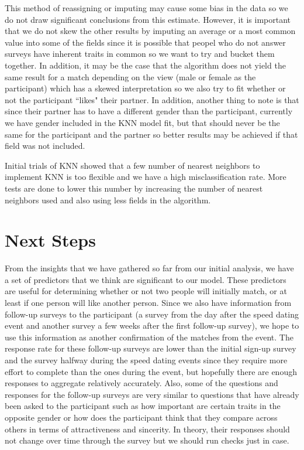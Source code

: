 \documentclass{article}
\begin{document}
This method of reassigning or imputing may cause some bias in the data so we do not draw significant conclusions from this estimate.  However, it is important that we do not skew the other results by imputing an average or a most common value into some of the fields since it is possible that peopel who do not answer surveys have inherent traits in common so we want to try and bucket them together.  In addition, it may be the case that the algorithm does not yield the same result for a match depending on the view (male or female as the participant) which has a skewed interpretation so we also try to fit whether or not the participant ``likes" their partner.  In addition, another thing to note is that since their partner has to have a different gender than the participant, currently we have gender included in the KNN model fit, but that should never be the same for the participant and the partner so better results may be achieved if that field was not included.

Initial trials of KNN showed that a few number of nearest neighbors to implement KNN is too flexible and we have a high misclassification rate.  More tests are done to lower this number by increasing the number of nearest neighbors used and also using less fields in the algorithm.
 

\section{Next Steps}
From the insights that we have gathered so far from our initial analysis, we have a set of predictors that we think are significant to our model.  These predictors are useful for determining whether or not two people will initially match, or at least if one person will like another person.  Since we also have information from follow-up surveys to the participant (a survey from the day after the speed dating event and another survey a few weeks after the first follow-up survey), we hope to use this information as another confirmation of the matches from the event.  The response rate for these follow-up surveys are lower than the initial sign-up survey and the survey halfway during the speed dating events since they require more effort to complete than the ones during the event, but hopefully there are enough responses to aggregate relatively accurately.  Also, some of the questions and responses for the follow-up surveys are very similar to questions that have already been asked to the participant such as how important are certain traits in the opposite gender or how does the participant think that they compare across others in terms of attractiveness and sincerity.  In theory, their responses should not change over time through the survey but we should run checks just in case.\\
\end{document}
